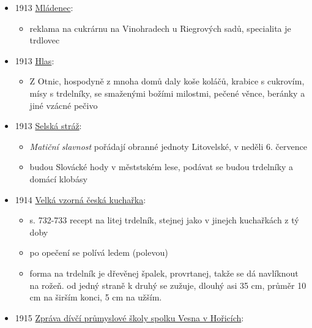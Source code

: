 \begin{itemize}
  \begin{itemize}
  \tightlist
  \item
    Z Otnic (národopisná slavnost)
  \item
    choť předsedy hasičů darovala mísu trdelníků a smažený boží milosti
  \end{itemize}
\item
  1913
  \href{https://ceskadigitalniknihovna.cz/view/uuid:6c6a5e90-917d-11e8-9588-5ef3fc9bb22f?page=uuid\%3A034ac5a0-9a3b-11e8-b814-5ef3fc9bb22f&fulltext=trdlovec&source=nkp}{Mládenec}:

  \begin{itemize}
  \tightlist
  \item
    reklama na cukrárnu na Vinohradech u Riegrových sadů, specialita je
    trdlovec
  \end{itemize}
\item
  1913
  \href{https://www.digitalniknihovna.cz/vkol/uuid/uuid:14f7dd3a-b613-4376-9e29-c359de568598}{Hlas}:

  \begin{itemize}
  \tightlist
  \item
    Z Otnic, hospodyně z mnoha domů daly koše koláčů, krabice s
    cukrovím, mísy s trdelníky, se smaženými božími milostmi, pečené
    věnce, beránky a jiné vzácné pečivo
  \end{itemize}
\item
  1913
  \href{https://www.digitalniknihovna.cz/vkol/uuid/uuid:70a353e2-2475-4efc-a7f2-a111978a691d}{Selská
  stráž}:

  \begin{itemize}
  \tightlist
  \item
    \emph{Matiční slavnost} pořádají obranné jednoty Litovelské, v
    neděli 6. července
  \item
    budou Slovácké hody v měststském lese, podávat se budou trdelníky a
    domácí klobásy
  \end{itemize}
\item
  1914
  \href{https://www.digitalniknihovna.cz/uzei/uuid/uuid:dcea1ada-9d5a-4be8-a92a-fdab1e9e93e0}{Velká
  vzorná česká kuchařka}:

  \begin{itemize}
  \tightlist
  \item
    s. 732-733 recept na litej trdelník, stejnej jako v jinejch
    kuchařkách z tý doby
  \item
    po opečení se polívá ledem (polevou)
  \item
    forma na trdelník je dřevěnej špalek, provrtanej, takže se dá
    navlíknout na rožeň. od jedný straně k druhý se zužuje, dlouhý asi
    35 cm, průměr 10 cm na širším konci, 5 cm na užším.
  \end{itemize}
\item
  1915
  \href{https://ndk.cz/uuid/uuid:f679b550-74ec-11ef-b80e-5ef3fc9bb22f}{Zpráva
  dívčí průmyslové školy spolku Vesna v Hořicích}:


\end{itemize}
